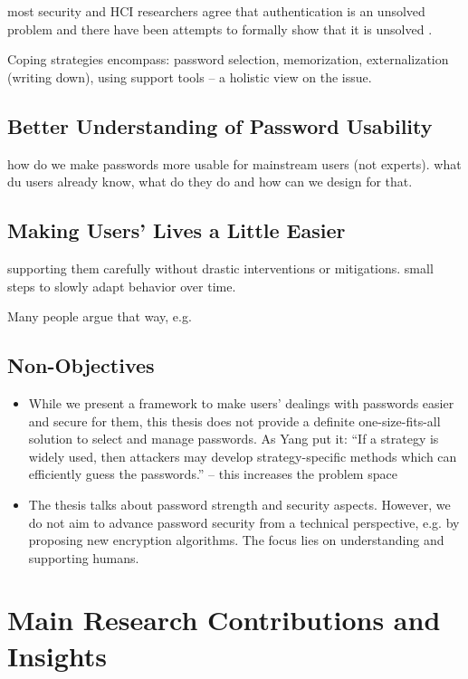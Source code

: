 most security and HCI researchers agree that authentication is an unsolved problem and there have been attempts to formally show that it is unsolved \cite{Bonneau2012ReplacePasswords, Bonneau2015ImperfectAuthentication, Herley2012PersistenceOfPasswords}. 


Coping strategies encompass: password selection, memorization, externalization (writing down), using support tools -- a holistic view on the issue. 


\subsection{Better Understanding of Password Usability}
how do we make passwords more usable for mainstream users (not experts). what du users already know, what do they do and how can we design for that. 

\subsection{Making Users' Lives a Little Easier}
supporting them carefully without drastic interventions or mitigations. small steps to slowly adapt behavior over time. 

Many people argue that way, e.g. \cite{Herley2012PersistenceOfPasswords}


\subsection{Non-Objectives}\label{sec:intro:non_objectives}

\begin{itemize}
	\item While we present a framework to make users' dealings with passwords easier and secure for them, this thesis does not provide a definite one-size-fits-all solution to select and manage passwords. As Yang \etal put it: ``If a strategy is widely used, then attackers may develop strategy-specific methods which can efficiently guess the passwords.'' -- this increases the problem space 
	\item The thesis talks about password strength and security aspects. However, we do not aim to advance password security from a technical perspective, e.g. by proposing new encryption algorithms. The focus lies on understanding and supporting humans. 
\end{itemize}


\section{Main Research Contributions and Insights}\label{sec:intro:contributions}

